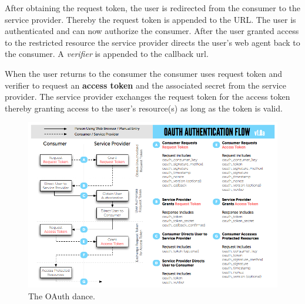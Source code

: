 After obtaining the request token, the user is redirected from the
consumer to the service provider. Thereby the request token is
appended to the URL. The user is authenticated and can now
authorize the consumer. After the user granted access to the
restricted resource the service provider directs the user's web
agent back to the consumer. A \emph{verifier} is appended to the
callback url.

When the user returns to the consumer the consumer uses request
token and verifier to request an \textbf{access token} and the
associated secret from the service provider. The service provider
exchanges the request token for the access token thereby granting
access to the user's resource(s) as long as the token is valid.


\begin{figure}
	\centering
	\includegraphics[width=\textwidth]{../oauth_diagram.png}
	\caption{The OAuth dance.} 
\end{figure}

